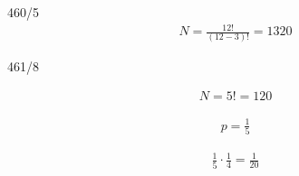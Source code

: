 \begin{exercise}{460/5}
  \begin{gather*}
    N = \frac{12!}{(12 - 3)!} = 1320
  \end{gather*}
\end{exercise}
\begin{exercise}{461/8}
  \item [a]
  \begin{gather*}
    N = 5! = 120
  \end{gather*}
  \item [b]
  \begin{gather*}
    p = \frac{1}{5}
  \end{gather*}
  \item [c]
  \begin{gather*}
    \frac{1}{5} \cdot \frac{1}{4} = \frac{1}{20}
  \end{gather*}
\end{exercise}
